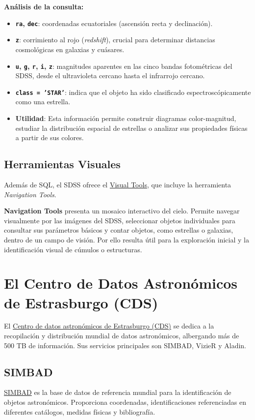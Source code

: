 \textbf{Análisis de la consulta:}
\begin{itemize}
    \item \textbf{\texttt{ra}, \texttt{dec}}: coordenadas ecuatoriales (ascensión recta y declinación).
    \item \textbf{\texttt{z}}: corrimiento al rojo (\textit{redshift}), crucial para determinar distancias cosmológicas en galaxias y cuásares.
    \item \textbf{\texttt{u}, \texttt{g}, \texttt{r}, \texttt{i}, \texttt{z}}: magnitudes aparentes en las cinco bandas fotométricas del SDSS, desde el ultravioleta cercano hasta el infrarrojo cercano.
    \item \textbf{\texttt{class = 'STAR'}}: indica que el objeto ha sido clasificado espectroscópicamente como una estrella.
    \item \textbf{Utilidad}: Esta información permite construir diagramas color-magnitud, estudiar la distribución espacial de estrellas o analizar sus propiedades físicas a partir de sus colores.
\end{itemize}

\subsection{Herramientas Visuales}
Además de SQL, el SDSS ofrece el \href{https://skyserver.sdss.org/dr17/VisualTools}{Visual Tools}, que incluye la herramienta \textit{Navigation Tools}. 

\textbf{Navigation Tools} presenta un mosaico interactivo del cielo. Permite navegar visualmente por las imágenes del SDSS, seleccionar objetos individuales para consultar sus parámetros básicos y contar objetos, como estrellas o galaxias, dentro de un campo de visión. Por ello resulta útil para la exploración inicial y la identificación visual de cúmulos o estructuras.

\section{El Centro de Datos Astronómicos de Estrasburgo (CDS)}

El \href{https://cds.u-strasbg.fr/}{Centro de datos astronómicos de Estrasburgo (CDS)} se dedica a la recopilación y distribución mundial de datos astronómicos, albergando más de 500 TB de información. Sus servicios principales son SIMBAD, VizieR y Aladin.

\subsection{SIMBAD}
\href{http://simbad.cds.unistra.fr/simbad/}{SIMBAD} es la base de datos de referencia mundial para la identificación de objetos astronómicos. Proporciona coordenadas, identificaciones referenciadas en diferentes catálogos, medidas físicas y bibliografía.

